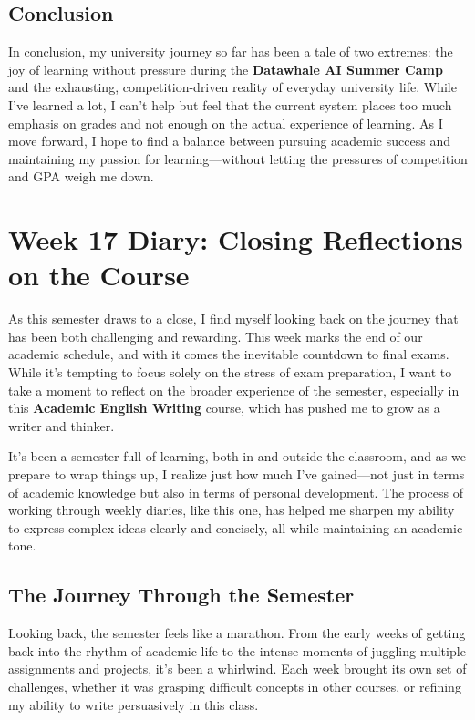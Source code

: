 \documentclass[a4paper]{article} 	%
\begin{document}
\subsection*{Conclusion}

In conclusion, my university journey so far has been a tale of two extremes: the joy of learning without pressure during the \textbf{Datawhale AI Summer Camp} and the exhausting, competition-driven reality of everyday university life. While I’ve learned a lot, I can’t help but feel that the current system places too much emphasis on grades and not enough on the actual experience of learning. As I move forward, I hope to find a balance between pursuing academic success and maintaining my passion for learning—without letting the pressures of competition and GPA weigh me down.

\section{Week 17 Diary: Closing Reflections on the Course}

As this semester draws to a close, I find myself looking back on the journey that has been both challenging and rewarding. This week marks the end of our academic schedule, and with it comes the inevitable countdown to final exams. While it’s tempting to focus solely on the stress of exam preparation, I want to take a moment to reflect on the broader experience of the semester, especially in this \textbf{Academic English Writing} course, which has pushed me to grow as a writer and thinker.

It’s been a semester full of learning, both in and outside the classroom, and as we prepare to wrap things up, I realize just how much I’ve gained—not just in terms of academic knowledge but also in terms of personal development. The process of working through weekly diaries, like this one, has helped me sharpen my ability to express complex ideas clearly and concisely, all while maintaining an academic tone.

\subsection*{The Journey Through the Semester}

Looking back, the semester feels like a marathon. From the early weeks of getting back into the rhythm of academic life to the intense moments of juggling multiple assignments and projects, it’s been a whirlwind. Each week brought its own set of challenges, whether it was grasping difficult concepts in other courses, or refining my ability to write persuasively in this class.
\end{document}
